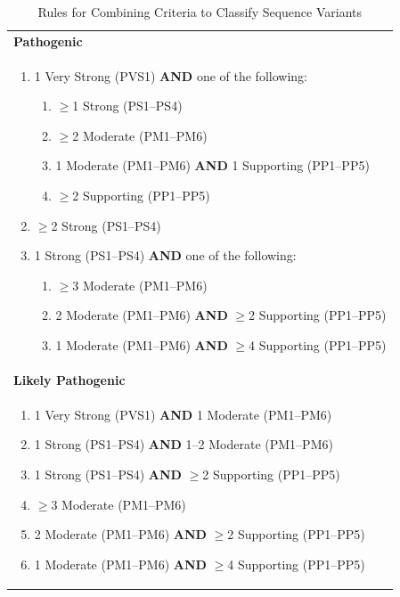 \documentclass[../main.tex]{subfiles}
\begin{document}
\begin{table}[h!]
\centering
\caption{Rules for Combining Criteria to Classify Sequence Variants }
\label{tab:acmg_rules_populated}
\begin{tabular}{p{}} %
\toprule
\textbf{Pathogenic} \\
\begin{enumerate}[label=\arabic*., wide, labelindent=0pt, topsep=2pt, itemsep=1pt]
    \item 1 Very Strong (PVS1) \textbf{AND} one of the following:
    \begin{enumerate}[label=(\alph*), leftmargin=*, topsep=1pt]
        \item $\ge$1 Strong (PS1--PS4)
        \item $\ge$2 Moderate (PM1--PM6)
        \item 1 Moderate (PM1--PM6) \textbf{AND} 1 Supporting (PP1--PP5)
        \item $\ge$2 Supporting (PP1--PP5)
    \end{enumerate}
    \item $\ge$2 Strong (PS1--PS4)
    \item 1 Strong (PS1--PS4) \textbf{AND} one of the following:
    \begin{enumerate}[label=(\alph*), leftmargin=*, topsep=1pt]
        \item $\ge$3 Moderate (PM1--PM6)
        \item 2 Moderate (PM1--PM6) \textbf{AND} $\ge$2 Supporting (PP1--PP5)
        \item 1 Moderate (PM1--PM6) \textbf{AND} $\ge$4 Supporting (PP1--PP5)
    \end{enumerate}
\end{enumerate}
\vspace{0.5em} \\ 
\midrule

\textbf{Likely Pathogenic} \\
\begin{enumerate}[label=\arabic*., wide, labelindent=0pt, topsep=2pt, itemsep=1pt]
    \item 1 Very Strong (PVS1) \textbf{AND} 1 Moderate (PM1--PM6)
    \item 1 Strong (PS1--PS4) \textbf{AND} 1--2 Moderate (PM1--PM6)
    \item 1 Strong (PS1--PS4) \textbf{AND} $\ge$2 Supporting (PP1--PP5)
    \item $\ge$3 Moderate (PM1--PM6)
    \item 2 Moderate (PM1--PM6) \textbf{AND} $\ge$2 Supporting (PP1--PP5)
    \item 1 Moderate (PM1--PM6) \textbf{AND} $\ge$4 Supporting (PP1--PP5)
\end{enumerate}
\vspace{0.5em} \\
\midrule


\end{tabular}
\end{table}
\end{document}
